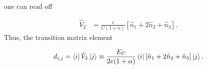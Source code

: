 \documentclass[%
superscriptaddress,
preprint,
preprintnumbers,
bibnotes,
amsmath,
amssymb,
aps,
showkeys,
prb,
]{revtex4-1}
\newcommand{\iket}[1]{\ensuremath{\Ket{#1}}}
\newcommand{\ibra}[1]{\ensuremath{\Bra{#1}}}
\newcommand{\iketbra}[2]{\ket{#1}\bra{#2}}
\newcommand{\iaverage}[1]{\ensuremath{\left\langle #1 \right\rangle}}
\begin{document}
  \noindent one can read off

  \begin{equation}
        \begin{aligned}
      \hat{V}_2 &  = \frac{e}{C(1+\alpha)}  \left[ \hat{n}_1  + 2\hat{n}_{2}
        +\hat{n}_3 \right].
    \end{aligned}
  \end{equation}
  Thus, the transition matrix element

    \begin{equation}
    \label{eq:dipole_voltage_6}
    d_{i,j} = \ibra{i}\hat{V}_2 \iket{j} \equiv \frac{E_{C}}{2 e (1+\alpha)}\ibra{i}\left[\hat{n}_1  +  2\hat{n}_{2}
        +\hat{n}_3 \right]\iket{j}.
  \end{equation}







\end{document}
